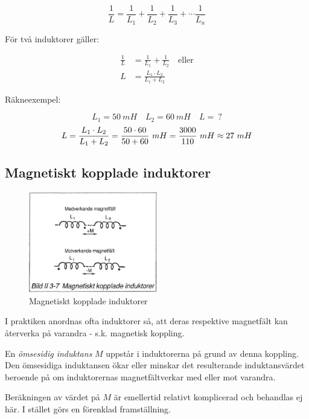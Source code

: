 \[
\frac{1}{L} = \frac{1}{L_1} + \frac{1}{L_2} + \frac{1}{L_3} +
\cdots \frac{1}{L_n}
\]

För två induktorer gäller:

\begin{align*}
  \frac{1}{L} &= \frac{1}{L_1} + \frac{1}{L_2} \quad \text{eller} \\
  L &= \frac{L_1 \cdot L_2}{L_1 + L_2}
\end{align*}

Räkneexempel:

\[L_1 = 50\ mH \quad L_2 = 60\ mH \quad L =\ ?\]
\[
  L = \frac{L_1 \cdot L_2}{L_1 + L_2} \\
  = \frac{50 \cdot 60}{50 + 60}\ mH \\
  = \frac{3000}{110}\ mH \\
  \approx 27\ mH
\]

\subsection{Magnetiskt kopplade induktorer}

\begin{figure}
\includegraphics[width=0.5\textwidth]{images/bild_2_3-07}
\caption{Magnetiskt kopplade induktorer}
\label{fig:BildII3-07}
\end{figure}

I praktiken anordnas ofta induktorer så, att deras respektive magnetfält kan
återverka på varandra - s.k. magnetisk koppling.

En \emph{ömsesidig induktans} \(M\) uppstår i induktorerna på grund av denna
koppling. Den ömsesidiga induktansen ökar eller minskar det resulterande
induktansvärdet beroende på om induktorernas magnetfältverkar med eller mot
varandra.

Beräkningen av värdet på \(M\) är emellertid relativt komplicerad och behandlas
ej här. I stället görs en förenklad framställning.

